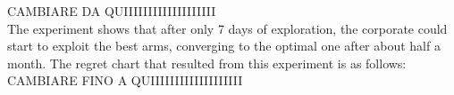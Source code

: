 CAMBIARE DA QUIIIIIIIIIIIIIIIIIII
\\The experiment shows that after only 7 days of exploration, the corporate could start to exploit the best arms, converging to the optimal one after about half a month.
\newpage
The regret chart that resulted from this experiment is as follows:\\
CAMBIARE FINO A QUIIIIIIIIIIIIIIIIIII